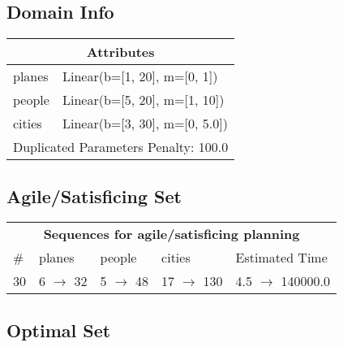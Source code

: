 \documentclass{article}
\begin{document}
                    \subsection*{Domain Info}

                    \begin{center}
                    \begin{tabular}{p{}p{}}
                    \multicolumn{2}{c}{\bf \large Attributes}\\\midrule
                    planes & Linear(b=[1, 20], m=[0, 1])\\
people & Linear(b=[5, 20], m=[1, 10])\\
cities & Linear(b=[3, 30], m=[0, 5.0])
                    
                     \\\midrule
                    \multicolumn{2}{l}{Duplicated Parameters Penalty: 100.0}
                    \end{tabular}
                    \end{center}
                
                         \subsection*{Agile/Satisficing Set}

                        \begin{center}
                        \begin{tabular}{l|l|l|l|l}
                        \multicolumn{5}{c}{\bf \large Sequences for agile/satisficing planning}\\
                        \# & planes & people & cities & Estimated Time\\\midrule
                        30&6 $\rightarrow$ 32&5 $\rightarrow$ 48&17 $\rightarrow$ 130&4.5 $\rightarrow$ 140000.0
                        \end{tabular}
                        \end{center}
                    
                            \subsection*{Optimal Set}
\end{document}
